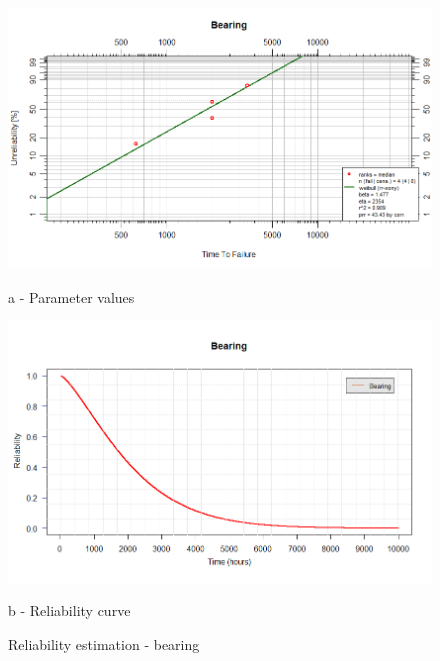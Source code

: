 \begin{figure}[!htb]
	\begin{minipage}[b]{0.5\linewidth}
		\centering
		\includegraphics[width=\textwidth]{figures/ch05_fig_reliability_bearing_parameter}
		\caption*{a - Parameter values}
	\end{minipage}
	\hspace{0.05cm}
	\begin{minipage}[b]{0.5\linewidth}
		\centering
		\includegraphics[width=\textwidth]{figures/ch05_fig_reliability_bearing_curve}
		\caption*{b - Reliability curve}
	\end{minipage}
	\caption{Reliability estimation - bearing}
	\label{ch05_fig_reliability_bearing}
\end{figure}
